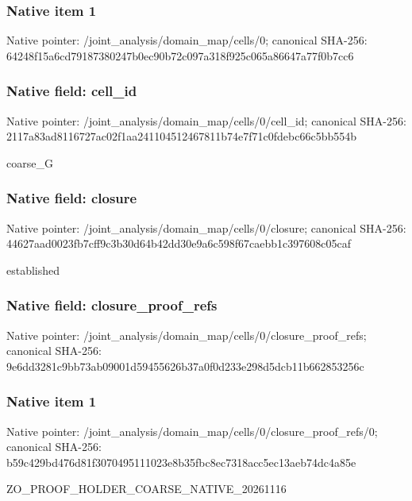 \documentclass[10pt,a4paper]{article}
\begin{document}
\subsubsection{Native item 1}
Native pointer: /joint\_\allowbreak{}analysis/domain\_\allowbreak{}map/cells/0; canonical SHA-256: 64248f15a6cd79187380247b0ec90b72c097a318f925c065a86647a77f0b7cc6

\subsubsection{Native field: cell\_\allowbreak{}id}
Native pointer: /joint\_\allowbreak{}analysis/domain\_\allowbreak{}map/cells/0/cell\_\allowbreak{}id; canonical SHA-256: 2117a83ad8116727ac02f1aa241104512467811b74e7f71c0fdebc66c5bb554b

\begingroup\raggedright\sloppy coarse\_\allowbreak{}G\par\endgroup

\subsubsection{Native field: closure}
Native pointer: /joint\_\allowbreak{}analysis/domain\_\allowbreak{}map/cells/0/closure; canonical SHA-256: 44627aad0023fb7cff9c3b30d64b42dd30e9a6c598f67caebb1c397608c05caf

\begingroup\raggedright\sloppy established\par\endgroup

\subsubsection{Native field: closure\_\allowbreak{}proof\_\allowbreak{}refs}
Native pointer: /joint\_\allowbreak{}analysis/domain\_\allowbreak{}map/cells/0/closure\_\allowbreak{}proof\_\allowbreak{}refs; canonical SHA-256: 9e6dd3281c9bb73ab09001d59455626b37a0f0d233e298d5dcb11b662853256c

\subsubsection{Native item 1}
Native pointer: /joint\_\allowbreak{}analysis/domain\_\allowbreak{}map/cells/0/closure\_\allowbreak{}proof\_\allowbreak{}refs/0; canonical SHA-256: b59c429bd476d81f3070495111023e8b35fbc8ec7318acc5ec13aeb74dc4a85e

\begingroup\raggedright\sloppy ZO\_\allowbreak{}PROOF\_\allowbreak{}HOLDER\_\allowbreak{}COARSE\_\allowbreak{}NATIVE\_\allowbreak{}20261116\par\endgroup
\end{document}
